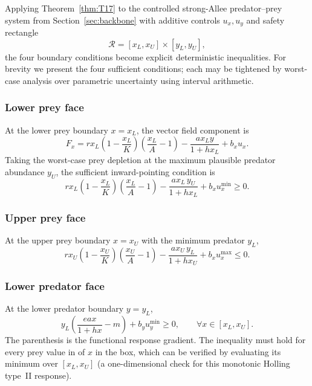 Applying Theorem~\ref{thm:T17} to the controlled strong-Allee predator--prey system from Section~\ref{sec:backbone} with additive controls \(u_x, u_y\) and safety rectangle
\begin{equation}
\mathcal{R} = [x_L, x_U] \times [y_L, y_U],
\label{eq:safe_box}
\end{equation}
the four boundary conditions become explicit deterministic inequalities. For brevity we present the four sufficient conditions; each may be tightened by worst-case analysis over parametric uncertainty using interval arithmetic.

\subsubsection*{Lower prey face}

At the lower prey boundary \(x = x_L\), the vector field component is
\[
F_x = r x_L \left(1 - \frac{x_L}{K}\right) \left(\frac{x_L}{A} - 1\right)
- \frac{a x_L y}{1 + h x_L} + b_x u_x.
\]
Taking the worst-case prey depletion at the maximum plausible predator abundance \(y_U\), the sufficient inward-pointing condition is
\begin{equation}
\boxed{
r x_L \left(1 - \frac{x_L}{K}\right) \left(\frac{x_L}{A} - 1\right)
- \frac{a x_L\, y_U}{1 + h x_L} + b_x u_x^{\min} \ge 0 }.
\label{eq:lower_prey}
\end{equation}

\subsubsection*{Upper prey face}

At the upper prey boundary \(x = x_U\) with the minimum predator \(y_L\),
\begin{equation}
\boxed{
r x_U \left(1 - \frac{x_U}{K}\right) \left(\frac{x_U}{A} - 1\right)
- \frac{a x_U\, y_L}{1 + h x_U} + b_x u_x^{\max} \le 0 }.
\label{eq:upper_prey}
\end{equation}

\subsubsection*{Lower predator face}

At the lower predator boundary \(y = y_L\),
\begin{equation}
\boxed{
y_L \left(\frac{e a x}{1 + h x} - m\right) + b_y u_y^{\min} \ge 0,\qquad
\forall x \in [x_L, x_U] }.
\label{eq:lower_pred}
\end{equation}
The parenthesis is the functional response gradient. The inequality must hold for every prey value in of \(x\) in the box, which can be verified by evaluating its minimum over \([x_L, x_U]\) (a one-dimensional check for this monotonic Holling type~II response).

